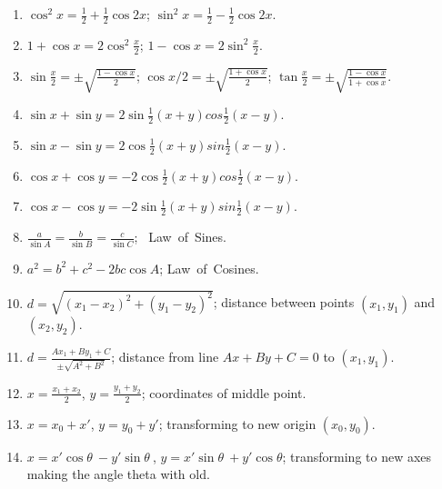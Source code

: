 \begin{enumerate}
\item
$\cos^2 x = \frac{1}{2} + \frac{1}{2} \cos 2x$; 
$\sin^2 x = \frac{1}{2} - \frac{1}{2} \cos 2x$.

\item
$1 + \cos x = 2 \cos^2 \frac{x}{2}$; 
$1 - \cos x = 2 \sin^2 \frac{x}{2}$.

 \item
$\sin \frac{x}{2} = \pm \sqrt{ \frac{1 - \cos x}{2} }$; 
$\cos x/2 = \pm \sqrt{ \frac{1 + \cos x}{2} }$; 
$\tan \frac{x}{2} = \pm \sqrt{ \frac{1 - \cos x}{1 + \cos x}}$.

\item
$\sin x + \sin y = 2 \sin \frac{1}{2} (x + y) cos \frac{1}{2} (x - y)$.

\item
$\sin x - \sin y = 2 \cos \frac{1}{2} (x + y) sin \frac{1}{2} (x - y)$.

\item
$\cos x + \cos y = -2 \cos \frac{1}{2} (x + y) cos \frac{1}{2} (x - y)$.

\item
$\cos x - \cos y = -2 \sin \frac{1}{2} (x + y) sin \frac{1}{2} (x - y)$.

\item
$\frac{a}{\sin A} = \frac{b}{\sin B} = \frac{c}{\sin C}$; 
\mbox{ Law of Sines}.

 \item
$a^2 = b^2 + c^2 − 2bc\cos A$; \mbox{Law of Cosines}.

\item
$d = \sqrt{ (x_1 - x_2)^2 + (y_1 - y_2)^2}$; 
distance between points $(x_1,y_1)$ and $(x_2,y_2)$.

\item
$d = \frac{Ax_1 + By_1 + C}{\pm \sqrt{A^2 + B^2}}$; 
distance from line $Ax + By + C = 0$ to $(x_1,y_1)$.

 \item
$x = \frac{x_1 + x_2}{2}$, $y = \frac{y_1 + y_2}{2}$; 
coordinates of middle point.

\item
$x = x_0 + x'$, $y = y_0 + y'$; transforming to new origin $(x_0,y_0)$.

\item
$x = x' \cos \theta\ - y' \sin \theta\ $, 
$y = x' \sin \theta\ + y' \cos \theta$; 
transforming to new axes making the angle theta with old.


\end{enumerate}
